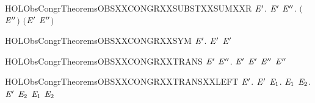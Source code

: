 \newcommand{\HOLObsCongrTheoremsOBSXXCONGRXXSUBSTXXSUMXXL}{\UseVerbatim{HOLObsCongrTheoremsOBSXXCONGRXXSUBSTXXSUMXXL}}
\begin{SaveVerbatim}{HOLObsCongrTheoremsOBSXXCONGRXXSUBSTXXSUMXXR}
\HOLTokenTurnstile{} \HOLSymConst{\HOLTokenForall{}} \ensuremath{\HOLBoundVar{E}\sp{\prime}}.   \ensuremath{\HOLBoundVar{E}\sp{\prime}} \HOLSymConst{\HOLTokenImp{}} \HOLSymConst{\HOLTokenForall{}}\ensuremath{\HOLBoundVar{E}\sp{\prime\prime}}.  \ensuremath{(} \HOLSymConst{\ensuremath{+}} \ensuremath{\HOLBoundVar{E}\sp{\prime\prime}}\ensuremath{)} \ensuremath{(}\ensuremath{\HOLBoundVar{E}\sp{\prime}} \HOLSymConst{\ensuremath{+}} \ensuremath{\HOLBoundVar{E}\sp{\prime\prime}}\ensuremath{)}
\end{SaveVerbatim}
\newcommand{\HOLObsCongrTheoremsOBSXXCONGRXXSUBSTXXSUMXXR}{\UseVerbatim{HOLObsCongrTheoremsOBSXXCONGRXXSUBSTXXSUMXXR}}
\begin{SaveVerbatim}{HOLObsCongrTheoremsOBSXXCONGRXXSYM}
\HOLTokenTurnstile{} \HOLSymConst{\HOLTokenForall{}} \ensuremath{\HOLBoundVar{E}\sp{\prime}}.   \ensuremath{\HOLBoundVar{E}\sp{\prime}} \HOLSymConst{\HOLTokenImp{}}  \ensuremath{\HOLBoundVar{E}\sp{\prime}} 
\end{SaveVerbatim}
\newcommand{\HOLObsCongrTheoremsOBSXXCONGRXXSYM}{\UseVerbatim{HOLObsCongrTheoremsOBSXXCONGRXXSYM}}
\begin{SaveVerbatim}{HOLObsCongrTheoremsOBSXXCONGRXXTRANS}
\HOLTokenTurnstile{} \HOLSymConst{\HOLTokenForall{}} \ensuremath{\HOLBoundVar{E}\sp{\prime}} \ensuremath{\HOLBoundVar{E}\sp{\prime\prime}}.
         \ensuremath{\HOLBoundVar{E}\sp{\prime}} \HOLSymConst{\HOLTokenConj{}}  \ensuremath{\HOLBoundVar{E}\sp{\prime}} \ensuremath{\HOLBoundVar{E}\sp{\prime\prime}} \HOLSymConst{\HOLTokenImp{}}   \ensuremath{\HOLBoundVar{E}\sp{\prime\prime}}
\end{SaveVerbatim}
\newcommand{\HOLObsCongrTheoremsOBSXXCONGRXXTRANS}{\UseVerbatim{HOLObsCongrTheoremsOBSXXCONGRXXTRANS}}
\begin{SaveVerbatim}{HOLObsCongrTheoremsOBSXXCONGRXXTRANSXXLEFT}
\HOLTokenTurnstile{} \HOLSymConst{\HOLTokenForall{}} \ensuremath{\HOLBoundVar{E}\sp{\prime}}.
         \ensuremath{\HOLBoundVar{E}\sp{\prime}} \HOLSymConst{\HOLTokenImp{}}
       \HOLSymConst{\HOLTokenForall{}} \ensuremath{\HOLBoundVar{E}\sb{\mathrm{1}}}.  \HOLTokenTransBegin{}\HOLTokenTransEnd \ensuremath{\HOLBoundVar{E}\sb{\mathrm{1}}} \HOLSymConst{\HOLTokenImp{}} \HOLSymConst{\HOLTokenExists{}}\ensuremath{\HOLBoundVar{E}\sb{\mathrm{2}}}. \ensuremath{\HOLBoundVar{E}\sp{\prime}} \HOLTokenWeakTransBegin{}\HOLTokenWeakTransEnd \ensuremath{\HOLBoundVar{E}\sb{\mathrm{2}}} \HOLSymConst{\HOLTokenConj{}}  \ensuremath{\HOLBoundVar{E}\sb{\mathrm{1}}} \ensuremath{\HOLBoundVar{E}\sb{\mathrm{2}}}
\end{SaveVerbatim}
